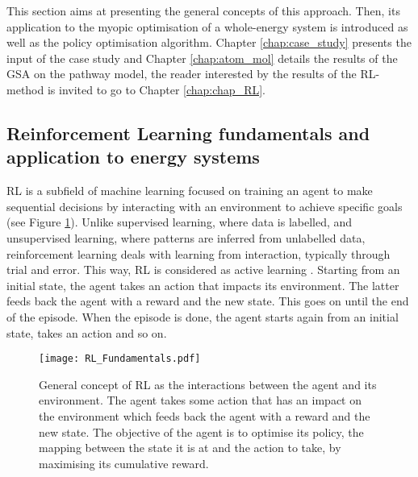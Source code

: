 This section aims at presenting the general concepts of this approach. Then, its application to the myopic optimisation of a whole-energy system is introduced as well as the policy optimisation algorithm. Chapter \ref{chap:case_study} presents the input of the case study and Chapter \ref{chap:atom_mol} details the results of the \gls{GSA} on the pathway model, the reader interested by the results of the \gls{RL}-method is invited to go to Chapter \ref{chap:chap_RL}.

\subsection[Reinforcement Learning fundamentals]{Reinforcement Learning fundamentals and application to energy systems}
\label{subsec:meth_RL_fundamentals}

\Gls{RL} is a subfield of machine learning focused on training an agent to make sequential decisions by interacting with an environment to achieve specific goals (see Figure \ref{fig:RL_Fundamentals}). Unlike supervised learning, where data is labelled, and unsupervised learning, where patterns are inferred from unlabelled data, reinforcement learning deals with learning from interaction, typically through trial and error. This way, \gls{RL} is considered as active learning \cite{cao2020reinforcement}. Starting from an initial state, the agent takes an action that impacts its environment. The latter feeds back the agent with a reward and the new state. This goes on until the end of the episode. When the episode is done, the agent starts again from an initial state, takes an action and so on. 

\begin{figure}[!htbp]
\centering
\texttt{[image: RL\_Fundamentals.pdf]}
\caption{General concept of \acrfull{RL} as the interactions between the agent and its environment. The agent takes some action that has an impact on the environment which feeds back the agent with a reward and the new state. The objective of the agent is to optimise its policy, \ie the mapping between the state it is at and the action to take, by maximising its cumulative reward.}
\label{fig:RL_Fundamentals}
\end{figure}

